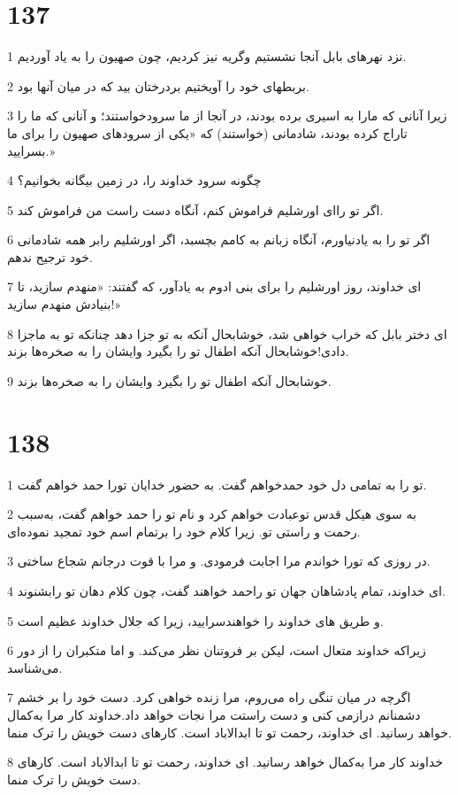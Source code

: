 \chapter{137}

\par 1 نزد نهرهای بابل آنجا نشستیم وگریه نیز کردیم، چون صهیون را به یاد آوردیم.
\par 2 بربطهای خود را آویختیم بردرختان بید که در میان آنها بود.
\par 3 زیرا آنانی که مارا به اسیری برده بودند، در آنجا از ما سرودخواستند؛ و آنانی که ما را تاراج کرده بودند، شادمانی (خواستند) که «یکی از سرودهای صهیون را برای ما بسرایید.»
\par 4 چگونه سرود خداوند را، در زمین بیگانه بخوانیم؟
\par 5 اگر تو را‌ای اورشلیم فراموش کنم، آنگاه دست راست من فراموش کند.
\par 6 اگر تو را به یادنیاورم، آنگاه زبانم به کامم بچسبد، اگر اورشلیم رابر همه شادمانی خود ترجیح ندهم.
\par 7 ای خداوند، روز اورشلیم را برای بنی ادوم به یادآور، که گفتند: «منهدم سازید، تا بنیادش منهدم سازید!»
\par 8 ‌ای دختر بابل که خراب خواهی شد، خوشابحال آنکه به تو جزا دهد چنانکه تو به ماجزا دادی!خوشابحال آنکه اطفال تو را بگیرد وایشان را به صخره‌ها بزند.
\par 9 خوشابحال آنکه اطفال تو را بگیرد وایشان را به صخره‌ها بزند.
 
\chapter{138}

\par 1 تو را به تمامی دل خود حمدخواهم گفت. به حضور خدایان تورا حمد خواهم گفت.
\par 2 به سوی هیکل قدس توعبادت خواهم کرد و نام تو را حمد خواهم گفت، به‌سبب رحمت و راستی تو. زیرا کلام خود را برتمام اسم خود تمجید نموده‌ای.
\par 3 در روزی که تورا خواندم مرا اجابت فرمودی. و مرا با قوت درجانم شجاع ساختی.
\par 4 ‌ای خداوند، تمام پادشاهان جهان تو راحمد خواهند گفت، چون کلام دهان تو رابشنوند.
\par 5 و طریق های خداوند را خواهندسرایید، زیرا که جلال خداوند عظیم است.
\par 6 زیراکه خداوند متعال است، لیکن بر فروتنان نظر می‌کند. و اما متکبران را از دور می‌شناسد.
\par 7 اگر‌چه در میان تنگی راه می‌روم، مرا زنده خواهی کرد. دست خود را بر خشم دشمنانم درازمی کنی و دست راستت مرا نجات خواهد داد.خداوند کار مرا به‌کمال خواهد رسانید. ای خداوند، رحمت تو تا ابدالاباد است. کارهای دست خویش را ترک منما.
\par 8 خداوند کار مرا به‌کمال خواهد رسانید. ای خداوند، رحمت تو تا ابدالاباد است. کارهای دست خویش را ترک منما.
 
